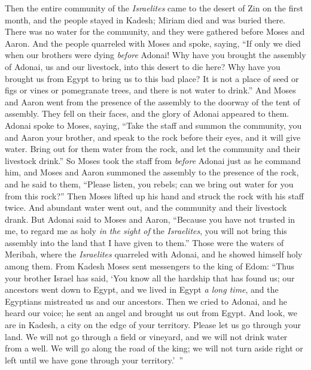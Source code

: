 \begin{biblechapter} %
 Then the entire community of the \textit{Israelites} came to the desert of Zin on the first month, and the people stayed in Kadesh; Miriam died and was buried there.
\verse There was no water for the community, and they were gathered before Moses and Aaron.
\verse And the people quarreled with Moses and spoke, saying, “If only we died when our brothers were dying \textit{before} Adonai!
\verse Why have you brought the assembly of Adonai, us and our livestock, into this desert to die here?
\verse Why have you brought us from Egypt to bring us to this bad place? It is not a place of seed or figs or vines or pomegranate trees, and there is not water to drink.”
\verse And Moses and Aaron went from the presence of the assembly to the doorway of the tent of assembly. They fell on their faces, and the glory of Adonai appeared to them.
\verse Adonai spoke to Moses, saying,
\verse “Take the staff and summon the community, you and Aaron your brother, and speak to the rock before their eyes, and it will give water. Bring out for them water from the rock, and let the community and their livestock drink.”
\verse So Moses took the staff from \textit{before} Adonai just as he command him,
\verse and Moses and Aaron summoned the assembly to the presence of the rock, and he said to them, “Please listen, you rebels; can we bring out water for you from this rock?”
\verse Then Moses lifted up his hand and struck the rock with his staff twice. And abundant water went out, and the community and their livestock drank.
\verse But Adonai said to Moses and Aaron, “Because you have not trusted in me, to regard me as holy \textit{in the sight of} the \textit{Israelites}, you will not bring this assembly into the land that I have given to them.”
\verse Those were the waters of Meribah, where the \textit{Israelites} quarreled with Adonai, and he showed himself holy among them.
\verse From Kadesh Moses sent messengers to the king of Edom: “Thus your brother Israel has said, ‘You know all the hardship that has found us;
\verse our ancestors went down to Egypt, and we lived in Egypt \textit{a long time}, and the Egyptians mistreated us and our ancestors.
\verse Then we cried to Adonai, and he heard our voice; he sent an angel and brought us out from Egypt. And look, we are in Kadesh, a city on the edge of your territory.
\verse Please let us go through your land. We will not go through a field or vineyard, and we will not drink water from a well. We will go along the road of the king; we will not turn aside right or left until we have gone through your territory.’ ”

\end{biblechapter}
